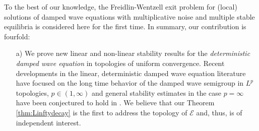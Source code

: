 \documentclass[10pt, reqno]{amsart}
\newcommand{\e}{\mathcal{E}}
\theoremstyle{definition}
\numberwithin{lem}{section}
\numberwithin{cor}{section}
\numberwithin{prop}{section}
\numberwithin{thm}{section}
\numberwithin{dfn}{section}
\begin{document}
    To the best of our knowledge, the Freidlin-Wentzell exit problem for (local) solutions of damped wave equations with multiplicative noise and multiple stable equilibria is considered here for the first time. In summary, our contribution is fourfold:
    \begin{itemize}
\item[a)] We prove new linear and non-linear stability results for the \textit{deterministic damped wave equation} in topologies of uniform convergence. Recent developments in the linear, deterministic damped wave equation literature \cite{chitour2024exponential,chitour2024p,kafnemer2022lp} have focused on the long time behavior of the damped wave semigroup in $L^p$ topologies, $p\in (1,\infty)$ and general stability estimates in the case $p=\infty$ have been conjectured to hold in \cite[pp.4]{chitour2024exponential}. We believe that our Theorem \ref{thm:Linftydecay} is the first to address the topology of $\e$ and, thus, is of independent interest.


\end{itemize}
\end{document}
